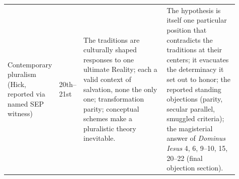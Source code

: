 \begin{longtable}{>{\raggedright\arraybackslash}p{0.14\linewidth}>{\raggedright\arraybackslash}p{0.10\linewidth}>{\raggedright\arraybackslash}p{0.36\linewidth}>{\raggedright\arraybackslash}p{0.31\linewidth}}
Contemporary pluralism (Hick, reported via named SEP witness) & 20th--21st & The traditions are culturally shaped responses to one ultimate Reality; each a valid context of salvation, none the only one; transformation parity; conceptual schemes make a pluralistic theory inevitable. & The hypothesis is itself one particular position that contradicts the traditions at their centers; it evacuates the determinacy it set out to honor; the reported standing objections (parity, secular parallel, smuggled criteria); the magisterial answer of \emph{Dominus Iesus} 4, 6, 9--10, 15, 20--22 (final objection section).\\
\end{longtable}
\endgroup
